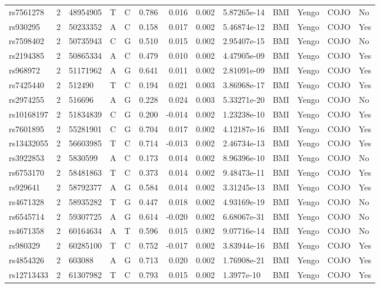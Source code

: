 \documentclass[11pt,twoside]{bristolthesis}
\begin{document}
\begin{longtable}[t]{lrlllrrrlllll}
rs7561278 & 2 & 48954905 & T & C & 0.786 & 0.016 & 0.002 & 5.87265e-14 & BMI & Yengo & COJO & No\\
rs930295 & 2 & 50233352 & A & C & 0.158 & 0.017 & 0.002 & 5.46874e-12 & BMI & Yengo & COJO & Yes\\
rs7598402 & 2 & 50735943 & C & G & 0.510 & 0.015 & 0.002 & 2.95407e-15 & BMI & Yengo & COJO & No\\
rs2194385 & 2 & 50865334 & A & C & 0.479 & 0.010 & 0.002 & 4.47905e-09 & BMI & Yengo & COJO & Yes\\
\addlinespace
rs968972 & 2 & 51171962 & A & G & 0.641 & 0.011 & 0.002 & 2.81091e-09 & BMI & Yengo & COJO & Yes\\
rs7425440 & 2 & 512490 & T & C & 0.194 & 0.021 & 0.003 & 3.86968e-17 & BMI & Yengo & COJO & Yes\\
rs2974255 & 2 & 516696 & A & G & 0.228 & 0.024 & 0.003 & 5.33271e-20 & BMI & Yengo & COJO & No\\
rs10168197 & 2 & 51834839 & C & G & 0.200 & -0.014 & 0.002 & 1.23238e-10 & BMI & Yengo & COJO & Yes\\
rs7601895 & 2 & 55281901 & C & G & 0.704 & 0.017 & 0.002 & 4.12187e-16 & BMI & Yengo & COJO & Yes\\
\addlinespace
rs13432055 & 2 & 56603985 & T & C & 0.714 & -0.013 & 0.002 & 2.46734e-13 & BMI & Yengo & COJO & Yes\\
rs3922853 & 2 & 5830599 & A & C & 0.173 & 0.014 & 0.002 & 8.96396e-10 & BMI & Yengo & COJO & No\\
rs6753170 & 2 & 58481863 & T & C & 0.373 & 0.014 & 0.002 & 9.48473e-11 & BMI & Yengo & COJO & Yes\\
rs929641 & 2 & 58792377 & A & G & 0.584 & 0.014 & 0.002 & 3.31245e-13 & BMI & Yengo & COJO & Yes\\
rs4671328 & 2 & 58935282 & T & G & 0.447 & 0.018 & 0.002 & 4.93169e-19 & BMI & Yengo & COJO & No\\
\addlinespace
rs6545714 & 2 & 59307725 & A & G & 0.614 & -0.020 & 0.002 & 6.68067e-31 & BMI & Yengo & COJO & No\\
rs4671358 & 2 & 60164634 & A & T & 0.596 & 0.015 & 0.002 & 9.07716e-14 & BMI & Yengo & COJO & No\\
rs980329 & 2 & 60285100 & T & C & 0.752 & -0.017 & 0.002 & 3.83944e-16 & BMI & Yengo & COJO & Yes\\
rs4854326 & 2 & 603088 & A & G & 0.713 & 0.020 & 0.002 & 1.76908e-21 & BMI & Yengo & COJO & Yes\\
rs12713433 & 2 & 61307982 & T & C & 0.793 & 0.015 & 0.002 & 1.3977e-10 & BMI & Yengo & COJO & Yes\\

\end{longtable}
\end{document}
